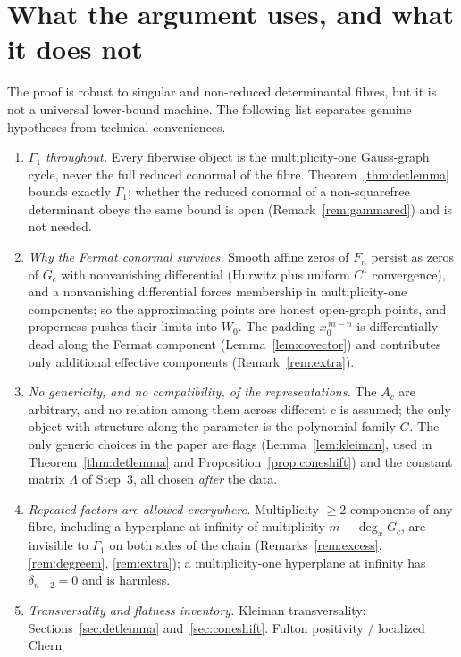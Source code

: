 \documentclass[acmsmall,screen,nonacm]{acmart}
\theoremstyle{definition}
\theoremstyle{remark}
\newcommand{\pdeg}{\delta}
\newcommand{\Gone}{\Gamma_{\!1}}
\begin{document}
\section{What the argument uses, and what it does not}\label{sec:scope}

The proof is robust to singular and non-reduced determinantal fibres, but it is not a universal lower-bound machine.  The following list separates genuine hypotheses from technical conveniences.

\begin{enumerate}[leftmargin=2em]
\item \emph{$\Gone$ throughout.}  Every fiberwise object is the
multiplicity-one Gauss-graph cycle, never the full reduced conormal of
the fibre.  Theorem~\ref{thm:detlemma} bounds exactly $\Gone$; whether
the reduced conormal of a non-squarefree determinant obeys the same
bound is open (Remark~\ref{rem:gammared}) and is not needed.
\item \emph{Why the Fermat conormal survives.}  Smooth affine zeros of
$F_n$ persist as zeros of $G_c$ with nonvanishing differential
(Hurwitz plus uniform $C^1$ convergence), and a nonvanishing
differential forces membership in multiplicity-one components; so the
approximating points are honest open-graph points, and properness
pushes their limits into $W_0$.  The padding $x_0^{\,m-n}$ is
differentially dead along the Fermat component
(Lemma~\ref{lem:covector}) and contributes only additional effective components
(Remark~\ref{rem:extra}).
\item \emph{No genericity, and no compatibility, of the
representations.}  The $A_c$ are arbitrary, and no relation among them
across different $c$ is assumed; the only object with structure along
the parameter is the polynomial family $G$.  The only generic choices
in the paper are flags (Lemma~\ref{lem:kleiman}, used in
Theorem~\ref{thm:detlemma} and Proposition~\ref{prop:coneshift}) and
the constant matrix $\Lambda$ of Step~3, all chosen \emph{after} the
data.
\item \emph{Repeated factors are allowed everywhere.}
Multiplicity-$\ge2$ components of any fibre, including a hyperplane
at infinity of multiplicity $m-\deg_xG_c$, are invisible to $\Gone$
on both sides of the chain (Remarks~\ref{rem:excess},
\ref{rem:degreem}, \ref{rem:extra}); a multiplicity-one hyperplane at
infinity has $\pdeg_{n-2}=0$ and is harmless.
\item \emph{Transversality and flatness inventory.}  Kleiman
transversality: Sections~\ref{sec:detlemma}
and~\ref{sec:coneshift}.  Fulton positivity / localized Chern

\end{enumerate}
\end{document}
